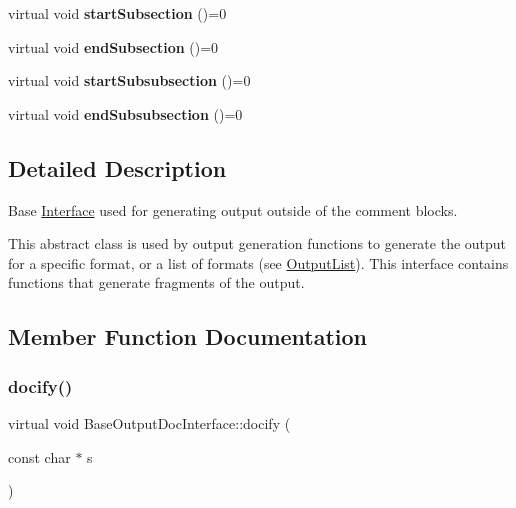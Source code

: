 \begin{DoxyCompactItemize}
virtual void {\bfseries start\+Subsection} ()=0
\item 
\mbox{\label{class_base_output_doc_interface_a3e403e27b8284843a8f3cf7e30e32d2c}} 
virtual void {\bfseries end\+Subsection} ()=0
\item 
\mbox{\label{class_base_output_doc_interface_a7f923f13c625fccde495debb5e31eb35}} 
virtual void {\bfseries start\+Subsubsection} ()=0
\item 
\mbox{\label{class_base_output_doc_interface_a760a6b33b261dafc6625b3cf49ba2124}} 
virtual void {\bfseries end\+Subsubsection} ()=0
\end{DoxyCompactItemize}


\subsection{Detailed Description}
Base \mbox{\hyperlink{class_interface}{Interface}} used for generating output outside of the comment blocks.

This abstract class is used by output generation functions to generate the output for a specific format, or a list of formats (see \mbox{\hyperlink{class_output_list}{Output\+List}}). This interface contains functions that generate fragments of the output. 

\subsection{Member Function Documentation}
\mbox{\label{class_base_output_doc_interface_ad7d3f6631bd157739170690e669b3e75}} 
\subsubsection{\texorpdfstring{docify()}{docify()}}
{\footnotesize\ttfamily virtual void Base\+Output\+Doc\+Interface\+::docify (\begin{DoxyParamCaption}\item[{const char $\ast$}]{s }\end{DoxyParamCaption})\hspace{0.3cm}{\ttfamily [pure virtual]}}


